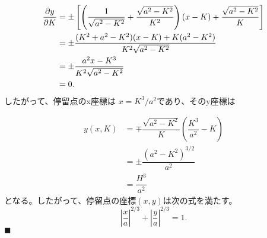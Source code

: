 \documentclass[twocolumn]{article}
\begin{document}
$$ \begin{aligned}
	{\frac{\partial y}{\partial K}} &= \pm\left[\left( \dfrac{1}{\sqrt{a^2-K^2}}+\dfrac{\sqrt{a^2-K^2}}{K^2}\right) (x-K) + \dfrac{\sqrt{a^2-K^2}}{K} \right]\\
	&= \pm \dfrac{(K^2+a^2-K^2)(x-K)+K(a^2-K^2)}{K^2\sqrt{a^2-K^2}}\\
	&= \pm \dfrac{a^2 x - K^3}{K^2 \sqrt{a^2 - K^2}}\\
	&= 0.
\end{aligned}
$$
したがって、停留点のx座標は $x = K^3/a^2$であり、そのy座標は

$$ \begin{aligned}
	y(x, K) &= \mp \dfrac{\sqrt{a^2-K^2}}{K}\left(\dfrac{K^3}{a^2}-K\right)\\
	& = \pm \dfrac{\left( a^2- K^2 \right)^{3/2}}{a^2}\\
	& = \dfrac{H^3}{a^2}
\end{aligned}
$$
となる。したがって、停留点の座標$(x, y)$は次の式を満たす。
$$ \left|\dfrac{x}{a}\right|^{2/3} + \left|\dfrac{y}{a}\right|^{2/3} = 1. $$
$\blacksquare$

\end{document}
